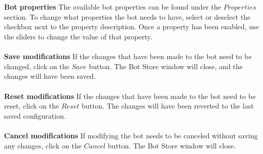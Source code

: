 \\\\
\textbf{Bot properties}
The available bot properties can be found under the $Properties$ section. To change what properties the bot needs to have, select or deselect the checkbox next to the property description. Once a property has been enabled, use the sliders to change the value of that property.
\\\\
\textbf{Save modifications}
If the changes that have been made to the bot need to be changed, click on the $Save$ button. The Bot Store window will close, and the changes will have been saved.
\\\\
\textbf{Reset modifications}
If the changes that have been made to the bot need to be reset, click on the $Reset$ button. The changes will have been reverted to the last saved configuration.
\\\\
\textbf{Cancel modifications}
If modifying the bot needs to be canceled without saving any changes, click on the $Cancel$ button. The Bot Store window will close.

